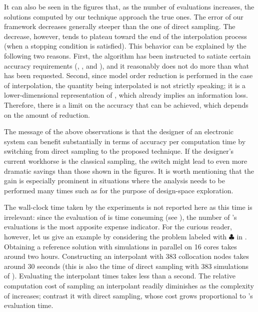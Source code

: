 It can also be seen in the figures that, as the number of evaluations increases,
the solutions computed by our technique approach the true ones. The error of our
framework decreases generally steeper than the one of direct sampling. The
decrease, however, tends to plateau toward the end of the interpolation process
(when a stopping condition is satisfied). This behavior can be explained by the
following two reasons. First, the algorithm has been instructed to satiate
certain accuracy requirements (, , and ), and it
reasonably does not do more than what has been requested. Second, since model
order reduction is performed in the case of interpolation, the quantity being
interpolated is not \g strictly speaking; it is a lower-dimensional
representation of \g, which already implies an information loss. Therefore,
there is a limit on the accuracy that can be achieved, which depends on the
amount of reduction.

The message of the above observations is that the designer of an electronic
system can benefit substantially in terms of accuracy per computation time by
switching from direct sampling to the proposed technique. If the designer's
current workhorse is the classical  sampling, the switch might lead to
even more dramatic savings than those shown in the figures. It is worth
mentioning that the gain is especially prominent in situations where the
analysis needs to be performed many times such as for the purpose of
design-space exploration.

\begin{remark}
The wall-clock time taken by the experiments is not reported here as this time
is irrelevant: since the evaluation of \g is time consuming (see
), the number of \g's evaluations is the most apposite
expense indicator. For the curious reader, however, let us give an example by
considering the problem labeled with $\clubsuit$ in
. Obtaining a reference solution with
 simulations in parallel on 16 cores takes around two hours.
Constructing an interpolant with 383 collocation nodes takes around 30 seconds
(this is also the time of direct sampling with 383 simulations of \g).
Evaluating the interpolant  times takes less than a second. The
relative computation cost of sampling an interpolant readily diminishes as the
complexity of \g increases; contrast it with direct sampling, whose cost grows
proportional to \g's evaluation time.
\end{remark}

